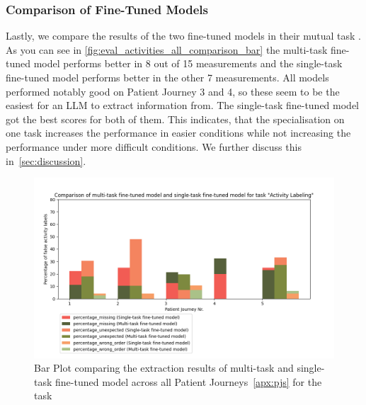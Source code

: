 \subsubsection{Comparison of Fine-Tuned Models}
Lastly, we compare the results of the two fine-tuned models in their mutual task . As you can see in \autoref{fig:eval_activities_all_comparison_bar} the multi-task fine-tuned model performs better in 8 out of 15 measurements and the single-task fine-tuned model performs better in the other 7 measurements. All models performed notably good on Patient Journey 3 and 4, so these seem to be the easiest for an LLM to extract information from. The single-task fine-tuned model got the best scores for both of them. This indicates, that the specialisation on one task increases the performance in easier conditions while not increasing the performance under more difficult conditions. We further discuss this in~\autoref{sec:discussion}.

\begin{figure}
    \centering
    \includegraphics[width=\textwidth]{bachelor_thesis/images/activites_all-single_vs_multi.png}
    \caption{Bar Plot comparing the extraction results of multi-task and single-task fine-tuned model across all Patient Journeys~\ref{apx:pjs} for the task } 
    \label{fig:eval_activities_all_comparison_bar}
\end{figure}
